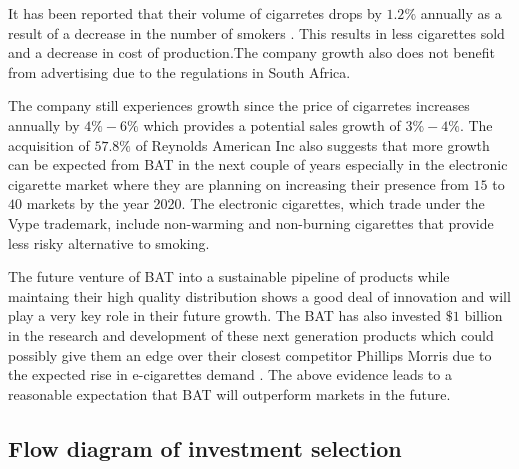 \documentclass[letterpaper, 10 pt, conference]{ieeeconf}  %
\begin{document}
It has been reported that their volume of cigarretes drops by $1.2\%$ annually as a result of a decrease in the number of smokers \cite{BAT_nextgen}. This results in less cigarettes sold and a decrease in cost of production.The company growth also does not benefit from advertising due to the regulations in South Africa.

The company still experiences growth since the price of cigarretes increases annually by $4\%-6\%$ \cite{BAT_hist} which provides a potential sales growth of $3\%-4\%$. The acquisition of $57.8\%$ of Reynolds American Inc \cite{BAT_vap} also suggests that more growth can be expected from BAT in the next couple of years especially in the electronic cigarette market where they are planning on increasing their presence from $15$ to $40$ markets by the year 2020. The electronic cigarettes, which trade under the Vype trademark, include non-warming and non-burning cigarettes that provide less risky alternative to smoking.

The future venture of BAT into a sustainable pipeline of products while maintaing their high quality distribution shows a good deal of innovation and will play a very key role in their future growth. The BAT has also invested $\$1$ billion in the research and development of these next generation products which could possibly give them an edge over their closest competitor Phillips Morris due to the expected rise in e-cigarettes demand \cite{BAT_comp}\cite{BAT_nextgen}. The above evidence leads to a reasonable expectation that BAT will outperform markets in the future.





 

\cleardoublepage
\appendix

\subsection{Flow diagram of investment selection}
\end{document}
